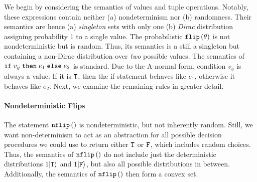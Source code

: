 We begin by considering the semantics of values and tuple operations.
Notably, these expressions contain neither (a) nondeterminism nor (b) randomness.
Their semantics are hence (a) \emph{singleton} sets with only one (b) \emph{Dirac} distribution assigning probability 1 to a single value.
The probabilistic $\texttt{flip} \left(\theta\right) $ is not nondeterministic but is random.
Thus, its semantics is a still a singleton but containing a non-Dirac distribution over \textit{two} possible values. 
The semantics of $\textnormal{\texttt{if}}\;{v_g}\;\texttt{then}\; e_1 \; \textnormal{\texttt{else}}\; e_2 $ is standard. 
Due to the A-normal form, condition $v_g$ is always a value.
If it is $\texttt{T}$, then the if-statement behaves like $e_1$, otherwise it behaves like $e_2$. 
Next, we examine the remaining rules in greater detail.

\paragraph{Nondeterministic Flips}
The statement $\texttt{nflip}\left(\right) $ is nondeterministic, but not inherently random. 
Still, we want non-determinism to act as an abstraction for all possible decision procedures we could use to return either $\texttt{T}$ or $\texttt{F}$, which includes random choices.
Thus, the semantics of $\texttt{nflip}\left(\right) $ do not include just the deterministic distributions $1|\texttt{T}\rangle$ and $1|\texttt{F}\rangle$, but also all possible distributions in between.
Additionally, the semantics of $\texttt{nflip}\left(\right) $ then form a convex set.

